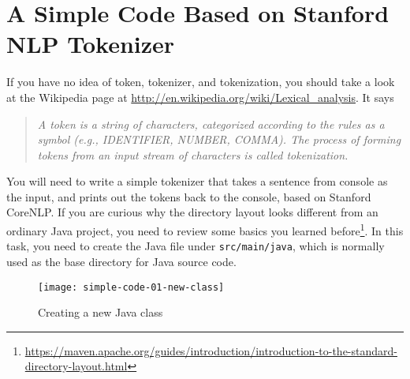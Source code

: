 
\section{A Simple Code Based on Stanford NLP Tokenizer}

If you have no idea of token, tokenizer, and tokenization, you should take a
look at the Wikipedia page at
\url{http://en.wikipedia.org/wiki/Lexical_analysis}. It says

\begin{quote}
\emph{A token is a string of characters, categorized according to the rules
as a symbol (e.g., IDENTIFIER, NUMBER, COMMA). The process of forming tokens
from an input stream of characters is called tokenization.}
\end{quote}

You will need to write a simple tokenizer that takes a sentence from console as
the input, and prints out the tokens back to the console, based on Stanford
CoreNLP. If you are curious why the directory layout looks different from an
ordinary Java project, you need to review some basics you learned
before\footnote{\url{https://maven.apache.org/guides/introduction/introduction-to-the-standard-directory-layout.html}}.
In this task, you need to create the Java file under \texttt{src/main/java},
which is normally used as the base directory for Java source code.

\begin{figure}
\centering
\texttt{[image: simple-code-01-new-class]}
\caption{Creating a new Java class\label{simple-code-01-new-class}}
\end{figure}

